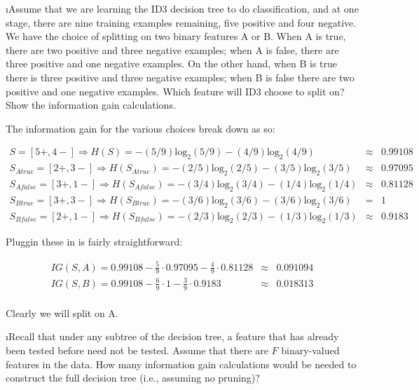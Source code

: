 \documentclass[fleqn]{article}
\begin{document}
\i Assume that we are learning the ID3 decision tree to do classification, and
 at one stage, there are nine training examples remaining, five positive and 
four negative. We have the choice of splitting on two binary features A or B. 
When A is true, there are two positive and three negative examples; when A is 
false, there are three positive and one negative examples. On the other hand, 
when B is true there is three positive and three negative examples; when B is 
false there are two positive and one negative examples. Which feature will ID3 
choose to split on? Show the information gain calculations.

\begin{solution}
The information gain for the various choices break down as so:

\begin{eqnarray*}
S = [5+, 4-] \Rightarrow H(S) = -(5/9) \mbox{log}_2 (5/9) - (4/9) \mbox{log}_2 (4/9) & \approx & 0.99108 \\[0.1in]
S_{Atrue} = [2+, 3-] \Rightarrow H(S_{Atrue}) = -(2/5) \mbox{log}_2 (2/5) - (3/5) \mbox{log}_2 (3/5) & \approx & 0.97095 \\
S_{Afalse} = [3+, 1-] \Rightarrow H(S_{Afalse}) = -(3/4) \mbox{log}_2 (3/4) - (1/4) \mbox{log}_2 (1/4) & \approx & 0.81128 \\[0.1in]
S_{Btrue} = [3+, 3-] \Rightarrow H(S_{Btrue}) = -(3/6) \mbox{log}_2 (3/6) - (3/6) \mbox{log}_2 (3/6) & = & 1 \\
S_{Bfalse} = [2+, 1-] \Rightarrow H(S_{Bfalse}) = -(2/3) \mbox{log}_2 (2/3) - (1/3) \mbox{log}_2 (1/3) & \approx & 0.9183
\end{eqnarray*}

Pluggin these in is fairly straightforward:

\begin{eqnarray*}
IG(S, A) = 0.99108 - \frac{5}{9} \cdot 0.97095 - \frac{4}{9} \cdot 0.81128 & \approx & 0.091094 \\[0.05in]
IG(S, B) = 0.99108 - \frac{6}{9} \cdot 1 - \frac{3}{9} \cdot 0.9183 & \approx & 0.018313 \\
\end{eqnarray*}

Clearly we will split on A.

\end{solution}

\i Recall that under any subtree of the decision tree, a feature that has already 
been tested before need not be tested. Assume that there are $F$ binary-valued 
features in the data. How many information gain calculations would be needed to 
construct the full decision tree (i.e., assuming no pruning)?
\end{document}
